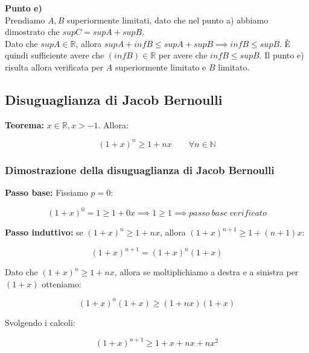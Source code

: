 \documentclass{article}
\begin{document}
\noindent \textbf{Punto e)}\\

\noindent Prendiamo $A, B$ superiormente limitati, dato che nel punto a) abbiamo dimostrato che $supC = supA + supB$. \\
Dato che $supA \in \mathbb{R}$, allora $supA + infB \leq supA + supB \implies infB \leq supB$. È quindi sufficiente avere che $(infB) \in \mathbb{R}$ per avere che $infB \leq supB$. Il punto e) risulta allora verificata per $A$ superiormente limitato e $B$ limitato.

\subsection{Disuguaglianza di Jacob Bernoulli}
\textbf{Teorema:} $x \in \mathbb{R}, x > -1$. Allora:

\begin{equation}
    (1 + x)^n \geq 1 + nx \qquad \forall n \in \mathbb{N}
    \label{eq:5}
\end{equation}

\subsubsection{Dimostrazione della disuguaglianza di Jacob Bernoulli}
\noindent\textbf{Passo base:} Fissiamo $p = 0$: 

\begin{equation*}
    (1 + x)^0 = 1 \geq 1 + 0x \implies 1 \geq 1 \implies passo \ base \ verificato
\end{equation*}

\noindent \textbf{Passo induttivo:} se $(1 + x)^n \geq 1 + nx$, allora $(1 + x)^{n+1} \geq 1 + (n+1)x$:

\begin{equation*}
    (1 + x)^{n+1} = (1+x)^n (1+x)
\end{equation*}

\noindent Dato che $(1 + x)^n \geq 1 + nx$, allora se moltiplichiamo a destra e a sinistra per $(1+x)$ otteniamo:

\begin{equation*}
    (1+x)^n (1+x) \geq (1+nx)(1+x)
\end{equation*}

\noindent Svolgendo i calcoli:

\begin{equation*}
    (1+x)^{n+1} \geq 1 + x + nx + nx^2
\end{equation*}
\end{document}
